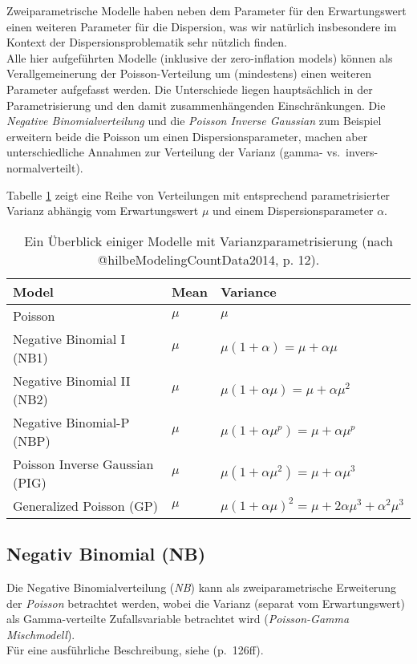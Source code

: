 \documentclass[ngerman,a4paper,]{scrartcl}
\theoremstyle{definition}
\theoremstyle{definition}
\theoremstyle{definition}
\theoremstyle{remark}
\begin{document}
Zweiparametrische Modelle haben neben dem Parameter für den Erwartungswert einen weiteren Parameter für die Dispersion, was wir natürlich insbesondere im Kontext der Dispersionsproblematik sehr nützlich finden.\\
Alle hier aufgeführten Modelle (inklusive der zero-inflation models) können als Verallgemeinerung der Poisson-Verteilung um (mindestens) einen weiteren Parameter aufgefasst werden. Die Unterschiede liegen hauptsächlich in der Parametrisierung und den damit zusammenhängenden Einschränkungen. Die \emph{Negative Binomialverteilung} und die \emph{Poisson Inverse Gaussian} zum Beispiel erweitern beide die Poisson um einen Dispersionsparameter, machen aber unterschiedliche Annahmen zur Verteilung der Varianz (gamma- vs.~invers-normalverteilt).

Tabelle \ref{tab:modelstable} zeigt eine Reihe von Verteilungen mit entsprechend parametrisierter Varianz abhängig vom Erwartungswert \(\mu\) und einem Dispersionsparameter \(\alpha\).

\begin{table}[t]

\caption{\label{tab:modelstable} Ein Überblick einiger Modelle mit Varianzparametrisierung (nach @hilbeModelingCountData2014, p. 12).}
\centering
\begin{tabular}{lll}
\toprule
Model & Mean & Variance\\
\midrule
Poisson & $\mu$ & $\mu$\\
Negative Binomial I (NB1) & $\mu$ & $\mu (1 + \alpha) = \mu + \alpha\mu$\\
Negative Binomial II (NB2) & $\mu$ & $\mu (1 + \alpha\mu) = \mu + \alpha\mu^2$\\
Negative Binomial-P (NBP) & $\mu$ & $\mu (1 + \alpha\mu^p) = \mu + \alpha\mu^p$\\
Poisson Inverse Gaussian (PIG) & $\mu$ & $\mu (1 + \alpha\mu^2) = \mu + \alpha\mu^3$\\
Generalized Poisson (GP) & $\mu$ & $\mu (1 + \alpha\mu)^2 = \mu + 2\alpha\mu^3 + \alpha^2\mu^3$\\
\bottomrule
\end{tabular}
\end{table}

\hypertarget{mod-nb}{%
\subsection{Negativ Binomial (NB)}\label{mod-nb}}

Die Negative Binomialverteilung (\emph{NB}) kann als zweiparametrische Erweiterung der \emph{Poisson} betrachtet werden, wobei die Varianz (separat vom Erwartungswert) als Gamma-verteilte Zufallsvariable betrachtet wird (\emph{Poisson-Gamma Mischmodell}).\\
Für eine ausführliche Beschreibung, siehe \citet{hilbeModelingCountData2014} (p.~126ff).
\end{document}
